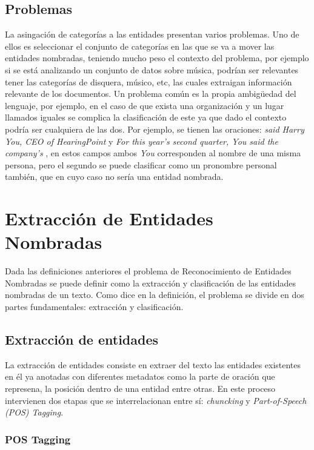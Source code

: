 \documentclass[runningheads]{llncs}
\begin{document}
\subsection{Problemas}

La asingación de categorías a las entidades presentan varios problemas. Uno de ellos es seleccionar el conjunto de categorías en las que se va a mover las entidades nombradas, teniendo mucho peso el contexto del problema, por ejemplo si se está analizando un conjunto de datos sobre música, podrían ser relevantes tener las categorías de disquera, músico, etc, las cuales extraigan información relevante de los documentos. Un problema común es la propia ambigüedad del lenguaje, por ejemplo, en el caso de que exista una organización y un lugar llamados iguales se complica la clasificación de este ya que dado el contexto podría ser cualquiera de las dos. Por ejemplo, se tienen las oraciones: \emph{said Harry You, CEO of HearingPoint} y \emph{For this year’s second quarter, You said the
company’s} \cite{semi_sup_for_ner}, en estos campos ambos \emph{You} corresponden al nombre de una misma persona, pero el segundo se puede clasificar como un pronombre personal también, que en cuyo caso no sería una entidad nombrada.

\section{Extracción de Entidades Nombradas}

Dada las definiciones anteriores el problema de Reconocimiento de Entidades Nombradas se puede definir como la extracción y clasificación de las entidades nombradas de un texto. Como dice en la definición, el problema se divide en dos partes fundamentales: extracción y clasificación.

\subsection{Extracción de entidades}

La extracción de entidades consiste en extraer del texto las entidades existentes en él ya anotadas con diferentes metadatos como la parte de oración que represena, la posición dentro de una entidad entre otras. En este proceso intervienen dos etapas que se interrelacionan entre sí: \emph{chuncking}\cite{chunking} y \emph{Part-of-Speech (POS) Tagging}\cite{postag}.

\subsubsection{POS Tagging}
\end{document}
